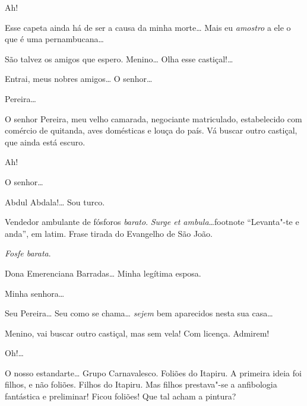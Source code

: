 \begin{linenumbers}
  
Ah! 

 Esse capeta ainda há de
ser a causa da minha morte\ldots{} Mais eu \textit{amostro}
a  ele o que é uma pernambucana\ldots{} 

 São talvez os
amigos que espero. 
Menino\ldots{} Olha esse
castiçal!\ldots{} 



 Entrai, meus nobres amigos\ldots{} 
O senhor\ldots{}

 Pereira\ldots{}

 O senhor Pereira, meu velho
camarada, negociante matriculado, estabelecido com comércio
de quitanda, aves domésticas e louça do
país.  Vá buscar outro castiçal,
que ainda está escuro.

 
Ah! 

 
O senhor\ldots{}

 Abdul Abdala!\ldots{} 
Sou turco.

 Vendedor
ambulante de fósforos \textit{barato}. \textit{Surge et
ambula}\ldots{}footnote{
``Levanta"-te e anda'', em latim. Frase tirada do Evangelho de São João.}

 \textit{Fosfe barata}. 

 Dona
Emerenciana Barradas\ldots{} Minha legítima esposa.

 Minha senhora\ldots{}

  
Seu Pereira\ldots{} Seu como se chama\ldots{} \textit{sejem} bem
aparecidos nesta sua casa\ldots{}

 
Menino, vai buscar outro
castiçal, mas sem vela!  Com licença.
Admirem!

  
Oh!\ldots{}

 O nosso
estandarte\ldots{}  Grupo
Carnavalesco. Foliões do Itapiru. A primeira ideia foi
filhos, e não foliões. Filhos do Itapiru. Mas filhos
prestava"-se a anfibologia fantástica e preliminar!
Ficou foliões! Que tal acham a pintura?


\end{linenumbers}
